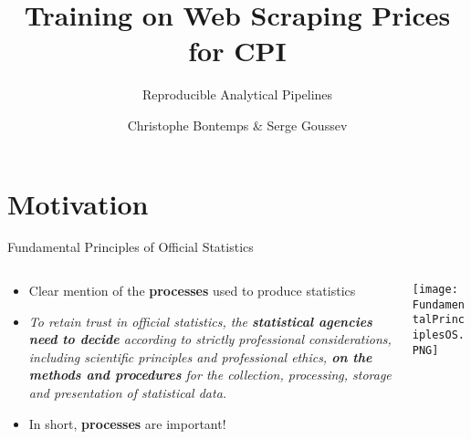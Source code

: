 \documentclass[xcolor=x11names,compress]{beamer}
\title{\textcolor{siap}{Training on Web Scraping Prices for CPI \\ \vspace{0.5cm} }}
\subtitle{\textcolor{brique}{\Large{ Reproducible Analytical Pipelines}}}
\author{Christophe Bontemps \& Serge Goussev }
\institute{ \texttt{[image: SIAP-ESCAP-Logo.png]} \hspace{1cm} \texttt{[image: StatCanada-Logo.jpg]}}
\date{}
\renewcommand{\(}{\begin{columns}}
\renewcommand{\)}{\end{columns}}
\newcommand{\<}[1]{\begin{column}{#1}}
\renewcommand{\>}{\end{column}}
\begin{document}
\section{Motivation}

\begin{frame}
  \titlepage
\end{frame}

\begin{frame}{Fundamental Principles of Official Statistics}
  \begin{columns}[T]
    \begin{column}{0.6\textwidth}
      \begin{itemize}[<+->]
        \item Clear mention of the \textbf{processes} used to produce statistics
        \item \emph{To retain trust in official statistics, the \textbf{statistical agencies need to decide} according to strictly professional considerations, including scientific principles and professional ethics, \textbf{on the methods and procedures} for the collection, processing, storage and presentation of statistical data.}
      \item In short, \textbf{processes} are important!
      \end{itemize}
    \end{column}
    \begin{column}{0.4\textwidth}
      \texttt{[image: FundamentalPrinciplesOS.PNG]}
    \end{column}
  \end{columns}
\end{frame}
\end{document}
